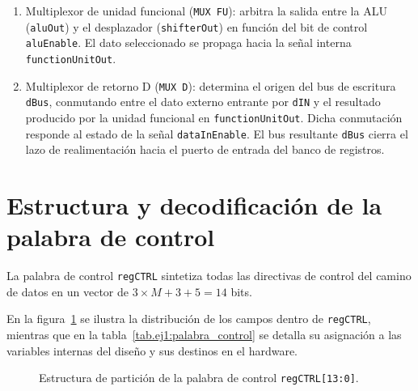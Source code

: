 \begin{enumerate}
  \item Multiplexor de unidad funcional (\texttt{MUX FU}): arbitra la salida entre la ALU (\texttt{aluOut}) y el
        desplazador (\texttt{shifterOut}) en función del bit de control \texttt{aluEnable}. El dato seleccionado se
        propaga hacia la señal interna \texttt{functionUnitOut}.
  \item Multiplexor de retorno D (\texttt{MUX D}): determina el origen del bus de escritura \texttt{dBus},
        conmutando entre el dato externo entrante por \texttt{dIN} y el resultado producido por la unidad funcional
        en \texttt{functionUnitOut}. Dicha conmutación responde al estado de la señal \texttt{dataInEnable}. El bus
        resultante \texttt{dBus} cierra el lazo de realimentación hacia el puerto de entrada del banco de registros.
\end{enumerate}

\section{Estructura y decodificación de la palabra de control}

La palabra de control \texttt{regCTRL} sintetiza todas las directivas de control del camino de datos en un vector de
$3\times M + 3 + 5 = 14$ bits.

En la figura~\ref{fig.ej1:palabra_control} se ilustra la distribución de los campos dentro de \texttt{regCTRL},
mientras que en la tabla~\ref{tab.ej1:palabra_control} se detalla su asignación a las variables internas del diseño y
sus destinos en el hardware.

\begin{figure}[!ht]
  \centering
  \resizebox{\textwidth}{!}{}
  \caption{Estructura de partición de la palabra de control \texttt{regCTRL[13:0]}.}
  \label{fig.ej1:palabra_control}
\end{figure}

